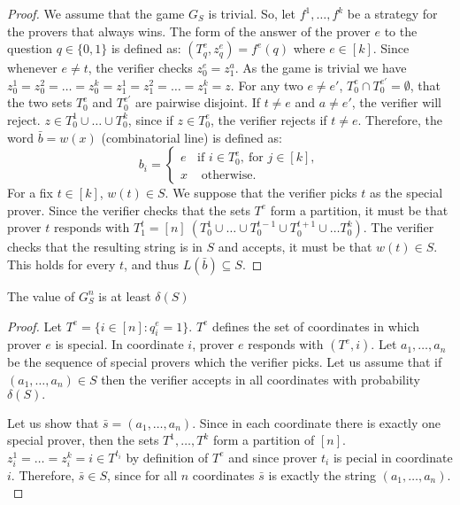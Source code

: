 \begin{proof}
We assume that the game $G_S$ is trivial. So, let $f^1, \ldots, f^k$ be a strategy for the provers that always wins. The form of the answer of the prover $e$ to the question $q \in \{0,1\}$ is defined as: $(T_q^e, z_q^e)=f^e(q)$ where $e \in [k]$.  Since whenever $e \neq t$, the verifier checks $z_0^e=z_1^a$. As the game is trivial we have $z_0^1=z_0^2= \ldots=z_0^k=z_1^1=z_1^2= \ldots=z_1^k=z$. 
For any two $e\neq e'$, $T_0^e \cap T_0^{e'}= \emptyset$, that the two sets $T_0^e $ and $T_0^{e'}$ are pairwise disjoint. If $t \neq e$ and $a\neq e'$, the verifier will reject.
$z \in T_0^1 \cup \ldots \cup T_0^k$, since if $z \in T_0^e$, the verifier rejects if $t \neq e$. Therefore, the word $\bar{b}=w(x)$ (combinatorial line)  is defined as: $$b_i=\left\lbrace \begin{array}{ll} e & \text{if } i \in T_0^e, \ \text{for }j \in [k], \\ x & \text{ otherwise}.\end{array} \right.$$
For a fix $t \in [k]$, $w(t) \in S.$ We suppose that  the verifier picks $t$ as the special prover. Since the verifier checks that the sets $T^e$ form a partition, it must be that prover $t$ responds with $T_1^t=[n] \ \left(T_0^1 \cup \ldots \cup T_0^{t-1} \cup T_0^{t+1} \cup \ldots T_0^k	 \right) .$ The verifier checks that the resulting string is in $S$ and accepts, it must be that $w(t) \in S.$ This holds for every $t$, and thus $L(\bar{b}) \subseteq S.$
\end{proof}

\begin{pro}	 The value of $G_S^n$ is at least $\delta(S)$	  \label{pr3} \end{pro}

\begin{proof}
Let  $T^e=\{i \in [n]: q_i^e=1\}$. $T^e$ defines the set of coordinates in which prover $e$ is special. In coordinate $i$, prover $e$ responds with $(T^e,i).$ Let $a_1, \ldots, a_n$ be the sequence of special provers which the verifier picks. Let us assume that if $(a_1, \ldots, a_n) \in S$ then the verifier accepts in all coordinates with probability $\delta(S).$ 

Let us show that $\bar{s}=(a_1, \ldots, a_n) $. Since in each coordinate there is exactly one special prover, then the sets $T^1, \ldots, T^k$ form a partition of $[n]$. $z_i^1=\ldots=z_i^k=i \in T^{t_i}$ by definition of $T^e$ and since prover $t_i$ is pecial in coordinate $i.$ Therefore, $\bar{s} \in S$, since for all $n$ coordinates $\bar{s}$ is exactly the string $(a_1, \ldots, a_n).$
\end{proof}





